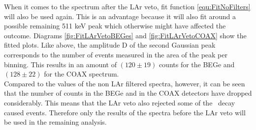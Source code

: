 \documentclass[encoding=utf8,british]{tumphthesis}
\begin{document}
When it comes to the spectrum after the LAr veto, fit function \ref{equ:FitNoFilters} will also be used again.
This is an advantage because it will also fit around a possible remaining 511 keV peak which otherwise might have affected the outcome.
Diagrams \ref{fig:FitLArVetoBEGes} and \ref{fig:FitLArVetoCOAX} show the fitted plots.
Like above, the amplitude D of the second Gaussian peak corresponds to the number of events measured in the area of the peak per binning.
This results in an amount of $(120\pm19)$ counts for the BEGe and $(128\pm22)$ for the COAX spectrum.
\\

Compared to the values of the non LAr filtered spectra, however, it can be seen that the number of counts in the BEGe and in the COAX detectors have dropped considerably.
This means that the LAr veto also rejected some of the \Kr\ decay caused events.
Therefore only the results of the spectra before the LAr veto will be used in the remaining analysis.
\\
\end{document}
